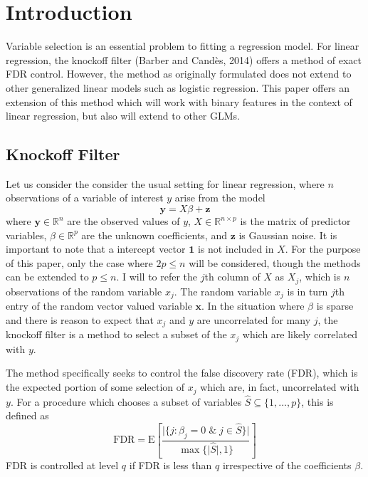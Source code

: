 \documentclass[11pt]{article}
\newcommand{\R}{\mathbb{R}}
\newcommand{\E}{\mathrm{E}}
\theoremstyle{definition}
\begin{document}
\newpage


\section{Introduction}
    Variable selection is an essential problem to fitting a regression model. For linear regression, the knockoff filter (Barber and Cand\`{e}s, 2014) offers a method of exact FDR control. However, the method as originally formulated does not extend to other generalized linear models such as logistic regression. This paper offers an extension of this method which will work with binary features in the context of linear regression, but also will extend to other GLMs.  
    
\subsection{Knockoff Filter}
    Let us consider the consider the usual setting for linear regression, where $n$ observations of a variable of interest $y$ arise from the model
    \[\mathbf{y} = X\beta + \mathbf{z}\]
    where $\mathbf{y}\in\R^n$ are the observed values of $y$, $X \in \R^{n\times p}$ is the matrix of predictor variables, $\beta\in\R^p$ are the unknown coefficients, and $\mathbf z$ is Gaussian noise. It is important to note that a intercept vector $\mathbf 1$ is not included in $X$. For the purpose of this paper, only the case where $2p\leq n$ will be considered, though the methods can be extended to $p\leq n$. I will to refer the $j$th column of $X$ as $X_j$, which is $n$ observations of the random variable $x_j$. The random variable $x_j$ is in turn $j$th entry of the random vector valued variable $\mathbf x$. In the situation where $\beta$ is sparse and there is reason to expect that $x_j$ and $y$ are uncorrelated for many $j$, the knockoff filter is a method to select a subset of the $x_j$ which are likely correlated with $y$. \par
    The method specifically seeks to control the false discovery rate (FDR), which is the expected portion of some selection of $x_j$ which are, in fact, uncorrelated with $y$. For a procedure which chooses a subset of variables $\hat S\subseteq \{1,\ldots,p\}$, this is defined as  
    \[ \textrm{FDR} = \E\left[\frac{\vert{\{j: \beta_j=0 \; \& \; j\in\hat S\}}\vert}{\max\{\vert{\hat S}\vert,1\}} \right] \]
    FDR is controlled at level $q$ if FDR is less than $q$ irrespective of the coefficients $\beta$. \par
\end{document}
